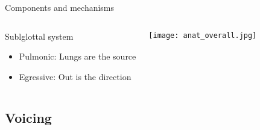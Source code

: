 \documentclass{beamer}
\newcommand{\subtwoone}{Components and mechanisms}
\newcommand{\subtwotwo}{Voicing}
\begin{document}
\begin{frame}{\subtwoone}
\begin{columns}
{\begin{minipage}[c][0.6\textheight]{\linewidth}
\begin{block}{Sublglottal system}
\begin{itemize}
                    \item \alert{Pulmonic}: Lungs are the source
                    \item \alert{Egressive}: Out is the direction
                  \end{itemize}
                \end{block}
              \end{minipage}
            }
            \begin{block}{}
              \texttt{[image: anat\_overall.jpg]}
            \end{block}
        \end{columns}
      \end{frame}

    \subsection{\subtwotwo}
\end{document}
